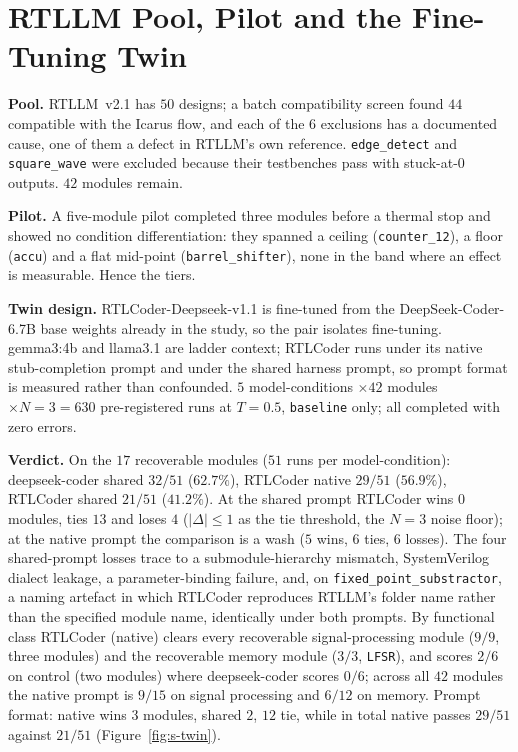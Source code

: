 \documentclass[11pt]{article}
\newcommand{\cond}[1]{\texttt{#1}}
\begin{document}
\section{RTLLM Pool, Pilot and the Fine-Tuning Twin}
\label{s:twin}

\textbf{Pool.} RTLLM~v2.1 has $50$ designs; a batch compatibility screen found
$44$ compatible with the Icarus flow, and each of the $6$ exclusions has a
documented cause, one of them a defect in RTLLM's own reference.
\texttt{edge\_detect} and \texttt{square\_wave} were excluded because their
testbenches pass with stuck-at-$0$ outputs. $42$ modules remain.

\textbf{Pilot.} A five-module pilot completed three modules before a thermal
stop and showed no condition differentiation: they spanned a ceiling
(\texttt{counter\_12}), a floor (\texttt{accu}) and a flat mid-point
(\texttt{barrel\_shifter}), none in the band where an effect is measurable.
Hence the tiers.

\textbf{Twin design.} RTLCoder-Deepseek-v1.1 is fine-tuned from the
DeepSeek-Coder-6.7B base weights already in the study, so the pair isolates
fine-tuning. gemma3:4b and llama3.1 are ladder context; RTLCoder runs under its
native stub-completion prompt and under the shared harness prompt, so prompt
format is measured rather than confounded. $5$ model-conditions $\times 42$
modules $\times N{=}3 = 630$ pre-registered runs at $T{=}0.5$,
\cond{baseline} only; all completed with zero errors.

\textbf{Verdict.} On the $17$ recoverable modules ($51$ runs per
model-condition): deepseek-coder shared $32/51$ ($62.7\%$), RTLCoder native
$29/51$ ($56.9\%$), RTLCoder shared $21/51$ ($41.2\%$). At the shared prompt
RTLCoder wins $0$ modules, ties $13$ and loses $4$ ($|\Delta|\leq1$ as the tie
threshold, the $N{=}3$ noise floor); at the native prompt the comparison is a
wash ($5$ wins, $6$ ties, $6$ losses). The four shared-prompt losses trace to a
submodule-hierarchy mismatch, SystemVerilog dialect leakage, a parameter-binding
failure, and, on \texttt{fixed\_point\_substractor}, a naming artefact in which
RTLCoder reproduces RTLLM's folder name rather than the specified module name,
identically under both prompts. By functional class RTLCoder (native) clears
every recoverable signal-processing module ($9/9$, three modules) and the
recoverable memory module ($3/3$, \texttt{LFSR}), and scores $2/6$ on control
(two modules) where deepseek-coder scores $0/6$; across all $42$ modules the
native prompt is $9/15$ on signal processing and $6/12$ on memory. Prompt
format: native wins $3$ modules, shared $2$, $12$ tie, while in total native
passes $29/51$ against $21/51$ (Figure~\ref{fig:s-twin}).
\end{document}
